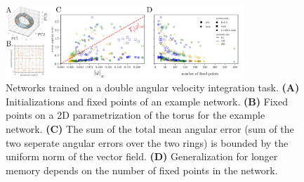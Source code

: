 \documentclass[letterpaper]{article}
\begin{document}
\begin{figure}[tbhp]
  \centering
  \includegraphics[width=0.8\textwidth]{davit}
  \caption{Networks trained on a double angular velocity integration task.
    \textbf{(A)} Initializations and fixed points of an example network.
    \textbf{(B)} Fixed points on a 2D parametrization of the torus for the example network.
    \textbf{(C)} The sum of the total mean angular error (sum of the two seperate angular errors over the two rings) is bounded by the uniform norm of the vector field.
    \textbf{(D)} Generalization for longer memory depends on the number of fixed points in the network.
}\label{fig:davit}
\end{figure}
\end{document}
